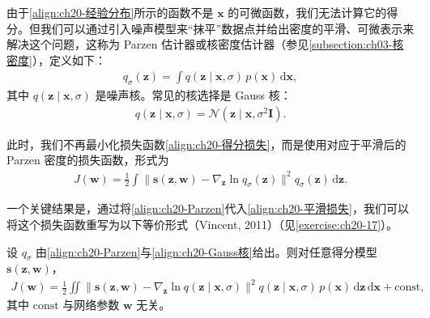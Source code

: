 \documentclass[../../main.tex]{subfiles}
\begin{document}
由于\eqref{align:ch20-经验分布}所示的函数不是 $\bm{x}$ 的可微函数，我们无法计算它的得分。但我们可以通过引入噪声模型来“抹平”数据点并给出密度的平滑、可微表示来解决这个问题，这称为 Parzen 估计器或核密度估计器（参见\cref{subsection:ch03-核密度}），定义如下：
\begin{align}
q_{\sigma}(\bm{z})=\int q(\bm{z}\mid\bm{x},\sigma)\,p(\bm{x})\,\mathrm{d}\bm{x},
\label{align:ch20-Parzen}
\end{align}
其中 $q(\bm{z}\mid\bm{x},\sigma)$ 是噪声核。常见的核选择是 Gauss 核：
\begin{align}
q(\bm{z}\mid\bm{x},\sigma)=\mathcal{N}(\bm{z}\mid\bm{x},\sigma^2\bm{I}).
\label{align:ch20-Gauss核}
\end{align}

此时，我们不再最小化损失函数\eqref{align:ch20-得分损失}，而是使用对应于平滑后的 Parzen 密度的损失函数，形式为
\begin{align}
J(\bm{w})=\frac{1}{2}\int\big\|\bm{s}(\bm{z},\bm{w})-\nabla_{\bm{z}}\ln q_{\sigma}(\bm{z})\big\|^2q_{\sigma}(\bm{z})\,\mathrm{d}\bm{z}.
\label{align:ch20-平滑损失}
\end{align}

一个关键结果是，通过将\eqref{align:ch20-Parzen}代入\eqref{align:ch20-平滑损失}，我们可以将这个损失函数重写为以下等价形式（Vincent, 2011）（见\cref{exercise:ch20-17}）。

\begin{proposition}[去噪得分匹配]\label{proposition:ch20-去噪得分匹配}
设 $q_{\sigma}$ 由\eqref{align:ch20-Parzen}与\eqref{align:ch20-Gauss核}给出。则对任意得分模型 $\bm{s}(\bm{z},\bm{w})$，
\begin{align}
J(\bm{w})=\frac{1}{2}\iint\big\|\bm{s}(\bm{z},\bm{w})-\nabla_{\bm{z}}\ln q(\bm{z}\mid\bm{x},\sigma)\big\|^2q(\bm{z}\mid\bm{x},\sigma)\,p(\bm{x})\,\mathrm{d}\bm{z}\,\mathrm{d}\bm{x}+\mathrm{const},
\label{align:ch20-等价损失}
\end{align}
其中 $\mathrm{const}$ 与网络参数 $\bm{w}$ 无关。
\end{proposition}
\end{document}
